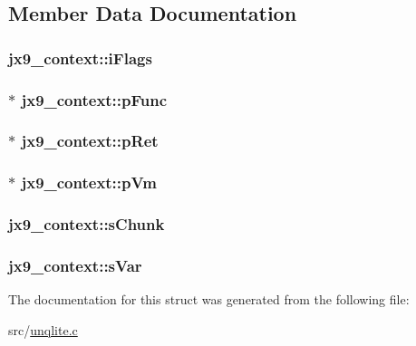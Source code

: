 \subsection{Member Data Documentation}
\hypertarget{structjx9__context_a370cb1ecfc146a07df80ad2c307cc160}{
\subsubsection[{i\-Flags}]{ jx9\-\_\-context\-::i\-Flags}}\label{d7/db7/structjx9__context_a370cb1ecfc146a07df80ad2c307cc160}
\hypertarget{structjx9__context_ae41bd1f00ddcbc91e5bb3208600fad90}{
\subsubsection[{p\-Func}]{$\ast$ jx9\-\_\-context\-::p\-Func}}\label{d7/db7/structjx9__context_ae41bd1f00ddcbc91e5bb3208600fad90}
\hypertarget{structjx9__context_a12a573fcc844cc18c3593f03e7f4a906}{
\subsubsection[{p\-Ret}]{$\ast$ jx9\-\_\-context\-::p\-Ret}}\label{d7/db7/structjx9__context_a12a573fcc844cc18c3593f03e7f4a906}
\hypertarget{structjx9__context_a40c5d65709457fd6d770ef16f31acfd9}{
\subsubsection[{p\-Vm}]{$\ast$ jx9\-\_\-context\-::p\-Vm}}\label{d7/db7/structjx9__context_a40c5d65709457fd6d770ef16f31acfd9}
\hypertarget{structjx9__context_a797c12d739e447c76d853bbb509e2e1e}{
\subsubsection[{s\-Chunk}]{ jx9\-\_\-context\-::s\-Chunk}}\label{d7/db7/structjx9__context_a797c12d739e447c76d853bbb509e2e1e}
\hypertarget{structjx9__context_a030feb1095c8edbcc2d07b025a3f4d71}{
\subsubsection[{s\-Var}]{ jx9\-\_\-context\-::s\-Var}}\label{d7/db7/structjx9__context_a030feb1095c8edbcc2d07b025a3f4d71}


The documentation for this struct was generated from the following file\-:\begin{DoxyCompactItemize}
\item 
src/\hyperlink{unqlite_8c}{unqlite.\-c}\end{DoxyCompactItemize}
